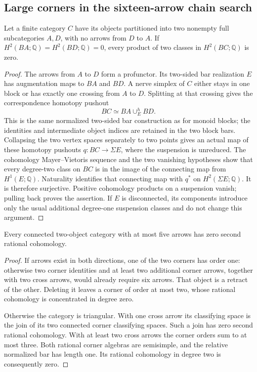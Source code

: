 \subsection{Large corners in the sixteen-arrow chain search}

\begin{lemma}
\label{C:two-block-zero-H2-products}
Let a finite category $C$ have its objects partitioned into two
nonempty full subcategories $A,D$, with no arrows from $D$ to $A$.
If $H^2(BA;\mathbb Q)=H^2(BD;\mathbb Q)=0$, every product of two
classes in $H^2(BC;\mathbb Q)$ is zero.
\end{lemma}
\begin{proof}
The arrows from $A$ to $D$ form a profunctor.  Its two-sided
bar realization $E$ has augmentation maps to $BA$ and $BD$.
A nerve simplex of $C$ either stays in one block or has exactly
one crossing from $A$ to $D$.  Splitting at that crossing gives
the correspondence homotopy pushout
\[
 BC\simeq BA\mathop{\cup}^{h}_{E}BD.
\]
This is the same normalized two-sided bar construction as for
monoid blocks; the identities and intermediate object indices
are retained in the two block bars.  Collapsing the two vertex
spaces separately to two points gives an actual map of these
homotopy pushouts $q:BC\to\Sigma E$, where the suspension is
unreduced.  The cohomology Mayer--Vietoris sequence and the two
vanishing hypotheses show that every degree-two class on $BC$
is in the image of the connecting map from $H^1(E;\mathbb Q)$.
Naturality identifies that connecting map with $q^*$ on
$H^2(\Sigma E;\mathbb Q)$.  It is therefore surjective.
Positive cohomology products on a suspension vanish; pulling
back proves the assertion.  If $E$ is disconnected, its
components introduce only the usual additional degree-one
suspension classes and do not change this argument.
\end{proof}

\begin{lemma}
\label{C:two-object-five-H2-zero}
Every connected two-object category with at most five arrows
has zero second rational cohomology.
\end{lemma}
\begin{proof}
If arrows exist in both directions, one of the two corners
has order one: otherwise two corner identities and at least
two additional corner arrows, together with two cross arrows,
would already require six arrows.  That object is a retract
of the other.  Deleting it leaves a corner of order at most
two, whose rational cohomology is concentrated in degree zero.

Otherwise the category is triangular.  With one cross arrow
its classifying space is the join of its two connected corner
classifying spaces.  Such a join has zero second rational
cohomology.  With at least two cross arrows the corner orders
sum to at most three.  Both rational corner algebras are
semisimple, and the relative normalized bar has length one.
Its rational cohomology in degree two is consequently zero.
\end{proof}

